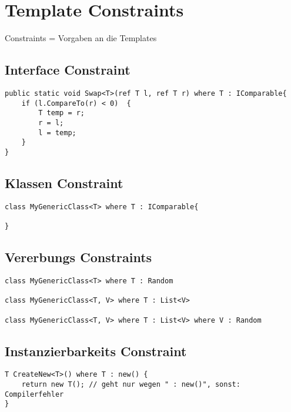 \section{Template Constraints}
Constraints = Vorgaben an die Templates

\subsection{Interface Constraint}

\begin{lstlisting}[language={[Sharp]C}]
public static void Swap<T>(ref T l, ref T r) where T : IComparable{
	if (l.CompareTo(r) < 0)  {
		T temp = r;
		r = l;
		l = temp;
	}
}
\end{lstlisting}

\subsection{Klassen Constraint}
\begin{lstlisting}[language={[Sharp]C}]
class MyGenericClass<T> where T : IComparable{

}
\end{lstlisting}
\subsection{Vererbungs Constraints}

\begin{lstlisting}[language={[Sharp]C}]
class MyGenericClass<T> where T : Random

class MyGenericClass<T, V> where T : List<V>

class MyGenericClass<T, V> where T : List<V> where V : Random
\end{lstlisting}

\subsection{Instanzierbarkeits Constraint}
\begin{lstlisting}[language={[Sharp]C}]
T CreateNew<T>() where T : new() {
	return new T(); // geht nur wegen " : new()", sonst: Compilerfehler
}
\end{lstlisting}